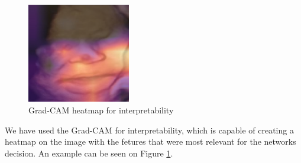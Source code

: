 \begin{figure}[h!tp]
    \centering
    \includegraphics[width=0.4\textwidth]{imgs/chap4_gradcam.png}
    \caption{Grad-CAM heatmap for interpretability}
    \label{fig:gradcam}
\end{figure}

We have used the Grad-CAM \citep{SelvarajuCDVPB17} for interpretability, which is capable of creating a heatmap on the image with the fetures that were most relevant for the networks decision. An example can be seen on Figure \ref{fig:gradcam}.

